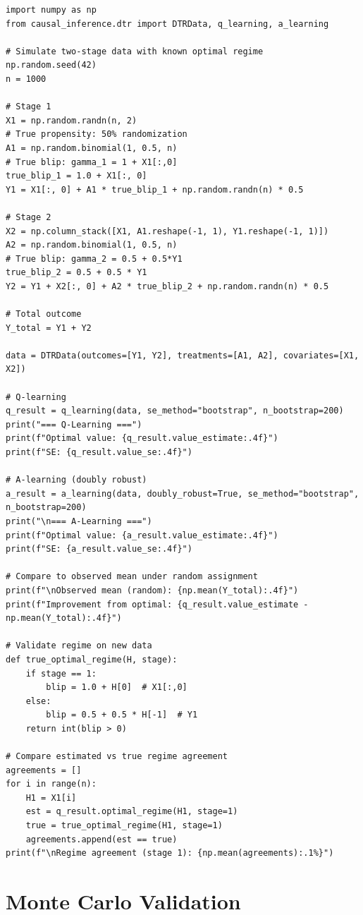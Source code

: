 \begin{verbatim}
import numpy as np
from causal_inference.dtr import DTRData, q_learning, a_learning

# Simulate two-stage data with known optimal regime
np.random.seed(42)
n = 1000

# Stage 1
X1 = np.random.randn(n, 2)
# True propensity: 50% randomization
A1 = np.random.binomial(1, 0.5, n)
# True blip: gamma_1 = 1 + X1[:,0]
true_blip_1 = 1.0 + X1[:, 0]
Y1 = X1[:, 0] + A1 * true_blip_1 + np.random.randn(n) * 0.5

# Stage 2
X2 = np.column_stack([X1, A1.reshape(-1, 1), Y1.reshape(-1, 1)])
A2 = np.random.binomial(1, 0.5, n)
# True blip: gamma_2 = 0.5 + 0.5*Y1
true_blip_2 = 0.5 + 0.5 * Y1
Y2 = Y1 + X2[:, 0] + A2 * true_blip_2 + np.random.randn(n) * 0.5

# Total outcome
Y_total = Y1 + Y2

data = DTRData(outcomes=[Y1, Y2], treatments=[A1, A2], covariates=[X1, X2])

# Q-learning
q_result = q_learning(data, se_method="bootstrap", n_bootstrap=200)
print("=== Q-Learning ===")
print(f"Optimal value: {q_result.value_estimate:.4f}")
print(f"SE: {q_result.value_se:.4f}")

# A-learning (doubly robust)
a_result = a_learning(data, doubly_robust=True, se_method="bootstrap", n_bootstrap=200)
print("\n=== A-Learning ===")
print(f"Optimal value: {a_result.value_estimate:.4f}")
print(f"SE: {a_result.value_se:.4f}")

# Compare to observed mean under random assignment
print(f"\nObserved mean (random): {np.mean(Y_total):.4f}")
print(f"Improvement from optimal: {q_result.value_estimate - np.mean(Y_total):.4f}")

# Validate regime on new data
def true_optimal_regime(H, stage):
    if stage == 1:
        blip = 1.0 + H[0]  # X1[:,0]
    else:
        blip = 0.5 + 0.5 * H[-1]  # Y1
    return int(blip > 0)

# Compare estimated vs true regime agreement
agreements = []
for i in range(n):
    H1 = X1[i]
    est = q_result.optimal_regime(H1, stage=1)
    true = true_optimal_regime(H1, stage=1)
    agreements.append(est == true)
print(f"\nRegime agreement (stage 1): {np.mean(agreements):.1%}")
\end{verbatim}


\section{Monte Carlo Validation}

